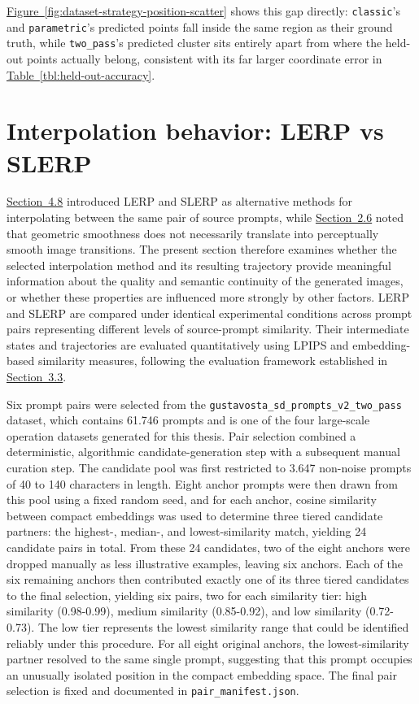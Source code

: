 \hyperref[fig:dataset-strategy-position-scatter]{Figure~\ref*{fig:dataset-strategy-position-scatter}} shows this gap directly: \texttt{classic}'s and \texttt{parametric}'s predicted points fall inside the same region as their ground truth, while \texttt{two\_pass}'s predicted cluster sits entirely apart from where the held-out points actually belong, consistent with its far larger coordinate error in \hyperref[tbl:held-out-accuracy]{Table~\ref*{tbl:held-out-accuracy}}.

\FloatBarrier
\section{Interpolation behavior: LERP vs SLERP}\label{sec:5.3}

\hyperref[sec:4.8]{Section~4.8} introduced LERP and SLERP as alternative methods for interpolating between the same pair of source prompts, while \hyperref[sec:2.6]{Section~2.6} noted that geometric smoothness does not necessarily translate into perceptually smooth image transitions. The present section therefore examines whether the selected interpolation method and its resulting trajectory provide meaningful information about the quality and semantic continuity of the generated images, or whether these properties are influenced more strongly by other factors. LERP and SLERP are compared under identical experimental conditions across prompt pairs representing different levels of source-prompt similarity. Their intermediate states and trajectories are evaluated quantitatively using LPIPS and embedding-based similarity measures, following the evaluation framework established in \hyperref[sec:3.3]{Section~3.3}.

Six prompt pairs were selected from the \texttt{gustavosta\_sd\_prompts\_v2\_two\_pass} dataset, which contains 61.746 prompts and is one of the four large-scale operation datasets generated for this thesis. Pair selection combined a deterministic, algorithmic candidate-generation step with a subsequent manual curation step. The candidate pool was first restricted to 3.647 non-noise prompts of 40 to 140 characters in length. Eight anchor prompts were then drawn from this pool using a fixed random seed, and for each anchor, cosine similarity between compact embeddings was used to determine three tiered candidate partners: the highest-, median-, and lowest-similarity match, yielding 24 candidate pairs in total. From these 24 candidates, two of the eight anchors were dropped manually as less illustrative examples, leaving six anchors. Each of the six remaining anchors then contributed exactly one of its three tiered candidates to the final selection, yielding six pairs, two for each similarity tier: high similarity (0.98-0.99), medium similarity (0.85-0.92), and low similarity (0.72-0.73). The low tier represents the lowest similarity range that could be identified reliably under this procedure. For all eight original anchors, the lowest-similarity partner resolved to the same single prompt, suggesting that this prompt occupies an unusually isolated position in the compact embedding space. The final pair selection is fixed and documented in \texttt{pair\_manifest.json}.

